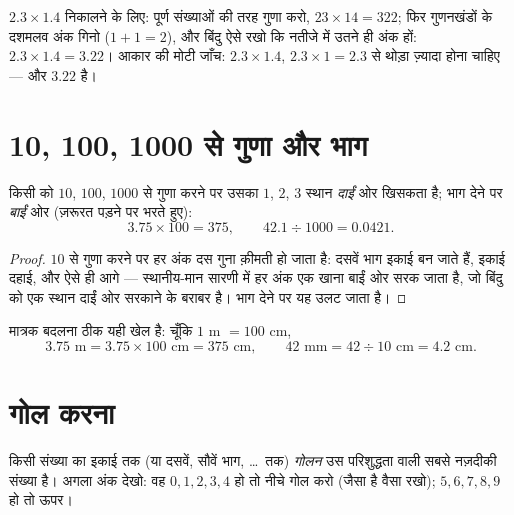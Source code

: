 \begin{example}[दशमलव संख्याओं का गुणा]\label{ex:g6:decimals:mult}
$2.3 \times 1.4$ निकालने के लिए: पूर्ण संख्याओं की तरह गुणा करो,
$23 \times 14 = 322$; फिर गुणनखंडों के दशमलव अंक गिनो
($1 + 1 = 2$), और बिंदु ऐसे रखो कि नतीजे में उतने ही अंक हों:
$2.3 \times 1.4 = 3.22$। आकार की मोटी जाँच: $2.3 \times 1.4$,
$2.3 \times 1 = 2.3$ से थोड़ा ज़्यादा होना चाहिए --- और $3.22$ है।
\end{example}

\section{10, 100, 1000 से गुणा और भाग}

\begin{proposition}[बिंदु का खिसकना]\label{prop:g6:decimals:shift}
किसी  को $10$, $100$, $1000$ से गुणा करने पर उसका
 $1$, $2$, $3$ स्थान \emph{दाईं} ओर खिसकता है; भाग
देने पर \emph{बाईं} ओर (ज़रूरत पड़ने पर  भरते हुए):
\[
3.75 \times 100 = 375, \qquad
42.1 \div 1000 = 0.0421 .
\]
\end{proposition}

\begin{proof}
$10$ से गुणा करने पर हर अंक दस गुना क़ीमती हो जाता है: दसवें भाग
इकाई बन जाते हैं, इकाई दहाई, और ऐसे ही आगे --- स्थानीय-मान सारणी
में हर अंक एक खाना बाईं ओर सरक जाता है, जो बिंदु को एक स्थान दाईं
ओर सरकाने के बराबर है। भाग देने पर यह उलट जाता है।
\end{proof}

\begin{example}[माप के मात्रक]\label{ex:g6:decimals:units}
मात्रक बदलना ठीक यही खेल है: चूँकि $1$ m $= 100$ cm,
\[
3.75 \text{ m} = 3.75 \times 100 \text{ cm} = 375 \text{ cm},
\qquad
42 \text{ mm} = 42 \div 10 \text{ cm} = 4.2 \text{ cm}.
\]
\end{example}

\section{गोल करना}

\begin{definition}[गोलन]\label{def:g6:decimals:rounding}
किसी संख्या का इकाई तक (या दसवें, सौवें भाग, \dots\ तक)
\emph{गोलन} उस परिशुद्धता वाली सबसे नज़दीकी संख्या
है। अगला अंक देखो: वह $0,1,2,3,4$ हो तो नीचे गोल करो (जैसा है
वैसा रखो); $5,6,7,8,9$ हो तो ऊपर।
\end{definition}


